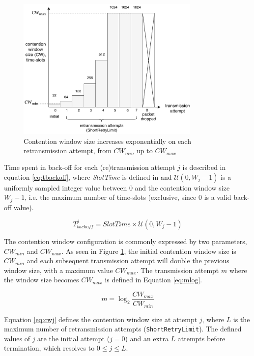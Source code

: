 \begin{figure}
\center
\includegraphics[width=0.8\textwidth]{images/contention-window-sizes.pdf}
\caption{Contention window size increases exponentially on each retransmission attempt, from $\mathit{CW}_{min}$ up to $\mathit{CW}_{max}$}
\label{fig:cwsizes}
\end{figure}

Time spent in back-off for each (re)transmission attempt $j$ is described in
equation \ref{eq:tbackoff}, where \emph{SlotTime} is defined in \cite{654749}
and $\mathcal{U}(0,W_j-1)$ is a uniformly sampled integer value between $0$
and the contention window size $W_{j}-1$, i.e. the maximum number of
time-slots (exclusive, since 0 is a valid back-off value).

\begin{equation} \label{eq:tbackoff}
T^j_{\mathit{backoff}} = \mathit{SlotTime} \times \mathcal{U}(0,W_j-1)
\end{equation}

The contention window configuration is commonly expressed by two parameters,
$CW_{min}$ and $CW_{max}$. As seen in Figure \ref{fig:cwsizes}, the initial
contention window size is $CW_{min}$ and each subsequent transmission attempt
will double the previous window size, with a maximum value $CW_{max}$. The
transmission attempt $m$ where the window size becomes $\mathit{CW}_{max}$ is
defined in Equation \ref{eq:mlog}.

\begin{equation} \label{eq:mlog}
m = \log_2 \frac{\mathit{CW}_{max}}{\mathit{CW}_{min}}
\end{equation}

Equation \ref{eq:cwj} defines the contention window size at attempt $j$, where
$L$ is the maximum number of retransmission attempts
(\texttt{ShortRetryLimit}). The defined values of $j$ are the initial attempt
($j=0$) and an extra $L$ attempts before termination, which resolves to $0
\leq j \leq L$.

